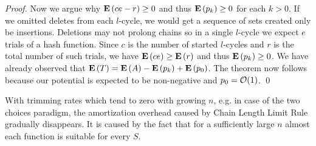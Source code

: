 \begin{proof}
Now we argue why $\mathbf{E}\left(ce - r\right) \geq 0$ and thus $\mathbf{E}\left(p_k\right) \geq 0$ for each $k >0$. If we omitted deletes from each $l$-cycle, we would get a sequence of sets created only be insertions. Deletions may not prolong chains so in a single $l$-cycle we expect $e$ trials of a hash function. Since $c$ is the number of started $l$-cycles and $r$ is the total number of such trials, we have $\mathbf{E}\left(ce\right) \geq \mathbf{E}\left(r\right)$ and thus $\mathbf{E}\left(p_k\right) \geq 0$. We have already observed that $\mathbf{E}\left(T\right) = \mathbf{E}\left(A\right) - \mathbf{E}\left(p_k\right) + \mathbf{E}\left(p_0\right)$. The theorem now follows because our potential is expected to be non-negative and $p_0 = \mathcal{O}(1)$. 
\qed
\end{proof}


With trimming rates which tend to zero with growing $n$, e.g. in case of the two choices paradigm, the amortization overhead caused by Chain Length Limit Rule gradually disappears. It is caused by the fact that for a sufficiently large $n$ almost each function is suitable for every $S$.
